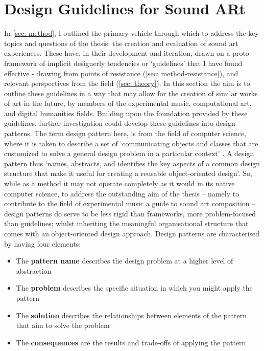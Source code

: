 \section{Design Guidelines for Sound ARt}\label{sec: discussion-guidelines}
In \autoref{sec: method}, I outlined the primary vehicle through which to address the key topics and questions of the thesis: the creation and evaluation of sound \gls{art} experiences. These have, in their development and iteration, drawn on a proto-framework of implicit designerly tendencies or `guidelines' that I have found effective - drawing from points of resistance (\autoref{sec: method-resistance}), and relevant perspectives from the field (\autoref{sec: theory}). In this section the aim is to outline these guidelines in a way that may allow for the creation of similar works of \gls{art} in the future, by members of the experimental music, computational art, and digital humanities fields. Building upon the foundation provided by these guidelines, further investigation could develop these guidelines into design patterns. The term design pattern here, is from the field of computer science, where it is taken to describe a set of `communicating objects and classes that are customized to solve a general design problem in a particular context' \citep{gamma1995}. A design pattern thus `names, abstracts, and identifies the key aspects of a common design structure that make it useful for creating a reusable object-oriented design'. So, while as a method it may not operate completely as it would in its native computer science, to address the outstanding aim of the thesis -- namely to contribute to the field of experimental music a guide to sound \gls{art} composition -- design patterns do serve to be less rigid than frameworks, more problem-focused than guidelines; whilst inheriting the meaningful organisational structure that comes with an object-oriented design approach. Design patterns are characterised by having four elements:
\begin{itemize}
    \item The \textbf{pattern name} describes the design problem at a higher level of abstraction
    \item The \textbf{problem} describes the specific situation in which you might apply the pattern
    \item The \textbf{solution} describes the relationships between elements of the pattern that aim to solve the problem
    \item The \textbf{consequences} are the results and trade-offs of applying the pattern
\end{itemize}

